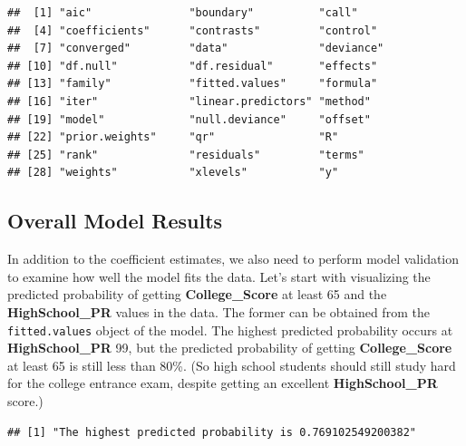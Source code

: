 \documentclass[
]{article}
\newenvironment{Shaded}{\begin{snugshade}}{\end{snugshade}}
\newcommand{\FunctionTok}[1]{\textcolor[rgb]{0.00,0.00,0.00}{#1}}
\newcommand{\NormalTok}[1]{#1}
\newcommand{\SpecialCharTok}[1]{\textcolor[rgb]{0.00,0.00,0.00}{#1}}
\newcommand{\StringTok}[1]{\textcolor[rgb]{0.31,0.60,0.02}{#1}}
\begin{document}
\begin{verbatim}
##  [1] "aic"               "boundary"          "call"             
##  [4] "coefficients"      "contrasts"         "control"          
##  [7] "converged"         "data"              "deviance"         
## [10] "df.null"           "df.residual"       "effects"          
## [13] "family"            "fitted.values"     "formula"          
## [16] "iter"              "linear.predictors" "method"           
## [19] "model"             "null.deviance"     "offset"           
## [22] "prior.weights"     "qr"                "R"                
## [25] "rank"              "residuals"         "terms"            
## [28] "weights"           "xlevels"           "y"
\end{verbatim}

\hypertarget{overall-model-results}{%
\subsection{Overall Model Results}\label{overall-model-results}}

In addition to the coefficient estimates, we also need to perform model
validation to examine how well the model fits the data. Let's start with
visualizing the predicted probability of getting \textbf{College\_Score}
at least 65 and the \textbf{HighSchool\_PR} values in the data. The
former can be obtained from the \texttt{fitted.values} object of the
model. The highest predicted probability occurs at
\textbf{HighSchool\_PR} 99, but the predicted probability of getting
\textbf{College\_Score} at least 65 is still less than 80\%. (So high
school students should still study hard for the college entrance exam,
despite getting an excellent \textbf{HighSchool\_PR} score.)

\begin{Shaded}
\end{Shaded}

\begin{verbatim}
## [1] "The highest predicted probability is 0.769102549200382"
\end{verbatim}

\begin{Shaded}
\end{Shaded}
\end{document}
